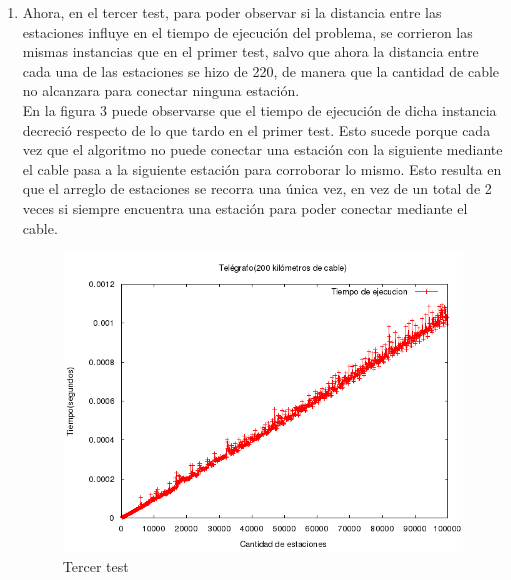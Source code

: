 \documentclass[10pt, a4paper]{article}
\begin{document}
\begin{enumerate}
	\item Ahora, en el tercer test, para poder observar si la distancia entre las estaciones influye en el tiempo de ejecuci\'on del problema, se corrieron las mismas instancias que en el primer test, salvo que ahora la distancia entre cada una de las estaciones se hizo de 220, de manera que la cantidad de cable no alcanzara para conectar ninguna estaci\'on.\\
	En la figura 3 puede observarse que el tiempo de ejecuci\'on de dicha instancia decreció respecto de lo que tardo en el primer test. Esto sucede porque cada vez que el algoritmo no puede conectar una estaci\'on con la siguiente mediante el cable pasa a la siguiente estaci\'on para corroborar lo mismo. Esto resulta en que el arreglo de estaciones se recorra una \'unica vez, en vez de un total de 2 veces si siempre encuentra una estaci\'on para poder conectar mediante el cable.\\
	\begin{figure}[H]
  		\centering
   	 	\includegraphics[width=1\textwidth]
   	 	{Imagenes/telegrafoTiempos6.png}
		\caption{Tercer test}
	\end{figure}
	

\end{enumerate}
\end{document}
